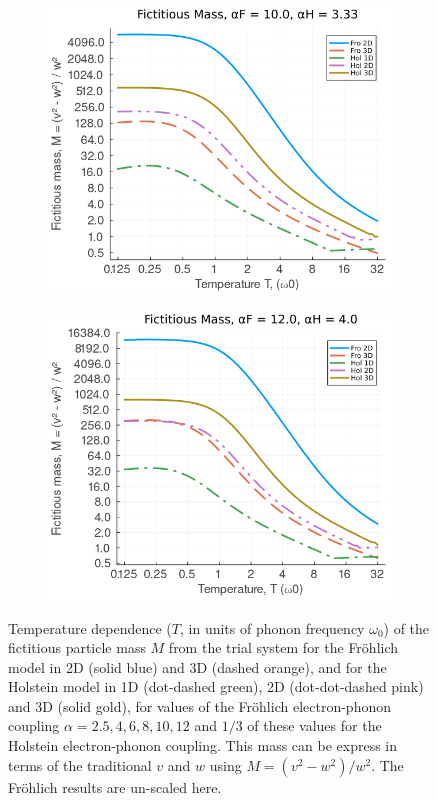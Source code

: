 \begin{figure}[!tbp]
\begin{subfigure}[b]{0.49\textwidth}
    \includegraphics[width=\textwidth]{figures/mass_temp_10_333.png}
  \end{subfigure}
  \hfill
  \begin{subfigure}[b]{0.49\textwidth}
    \includegraphics[width=\textwidth]{figures/mass_temp_12_4.png}
  \end{subfigure}
  \caption{Temperature dependence ($T$, in units of phonon frequency $\omega_0$) of the fictitious particle mass $M$ from the trial system for the Fr\"ohlich model in 2D (solid blue) and 3D (dashed orange), and for the Holstein model in 1D (dot-dashed green), 2D (dot-dot-dashed pink) and 3D (solid gold), for values of the Fr\"ohlich electron-phonon coupling $\alpha = 2.5, 4, 6, 8, 10, 12$ and $1/3$ of these values for the Holstein electron-phonon coupling. This mass can be express in terms of the traditional $v$ and $w$ using $M = (v^2 - w^2) / w^2$. The Fr\"ohlich results are un-scaled here.}
  \label{fig:mass_temp}
\end{figure}

